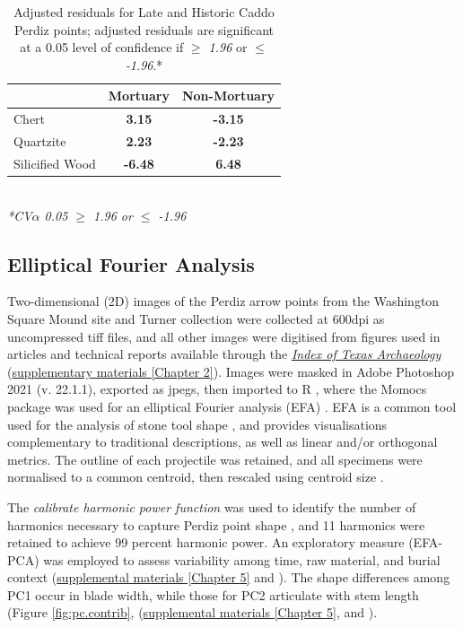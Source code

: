 \documentclass[review]{elsarticle}
\begin{document}
\begin{table}[tbh]\centering
\footnotesize
\caption{Adjusted residuals for Late and Historic Caddo Perdiz points; adjusted residuals are significant at a 0.05 level of confidence if \textit{$\geq$ 1.96} or \textit{$\leq$ -1.96}.*}
\centering
\begin{tabular}{lcc}
\hline
 & Mortuary & Non-Mortuary\\
\hline
Chert & \textbf{3.15} & \textbf{-3.15}\\
Quartzite & \textbf{2.23} & \textbf{-2.23}\\
Silicified Wood & \textbf{-6.48} & \textbf{6.48}\\
\hline
\end{tabular}\\
\textit{*CV$\alpha$ 0.05 $\geq$ 1.96 or $\leq$ -1.96}
\label{tab:Tbl4}
\end{table}

\subsection*{Elliptical Fourier Analysis}

Two-dimensional (2D) images of the Perdiz arrow points from the Washington Square Mound site and Turner collection were collected at 600dpi as uncompressed tiff files, and all other images were digitised from figures used in articles and technical reports available through the \href{https://scholarworks.sfasu.edu/ita/}{\textit{Index of Texas Archaeology}} (\href{https://aksel-blaise.github.io/perdiz/perdiz-arrow-point-sample.html}{supplementary materials [Chapter 2]}). Images were masked in Adobe Photoshop 2021 (v. 22.1.1), exported as jpegs, then imported to R \citep{RN8584}, where the Momocs package was used for an elliptical Fourier analysis (EFA) \citep{RN8925}. EFA is a common tool used for the analysis of stone tool shape \citep{RN2805,RN9003,RN6313,RN5230,RN5225,RN5227,RN8358,RN8967,RN5231,RN7164}, and provides visualisations complementary to traditional descriptions, as well as linear and/or orthogonal metrics. The outline of each projectile was retained, and all specimens were normalised to a common centroid, then rescaled using centroid size \citep{RN8923}. 

The \textit{calibrate harmonic power function} was used to identify the number of harmonics necessary to capture Perdiz point shape \citep{RN8925}, and 11 harmonics were retained to achieve 99 percent harmonic power. An exploratory measure (EFA-PCA) was employed to assess variability among time, raw material, and burial context (\href{https://aksel-blaise.github.io/perdiz/elliptical-fourier-analysis.html}{supplemental materials [Chapter 5]} and \citealt{RN8980}). The shape differences among PC1 occur in blade width, while those for PC2 articulate with stem length (Figure \ref{fig:pc.contrib}, (\href{https://aksel-blaise.github.io/perdiz/elliptical-fourier-analysis.html}{supplemental materials [Chapter 5]}, and \citealt{RN8980}).
\end{document}
